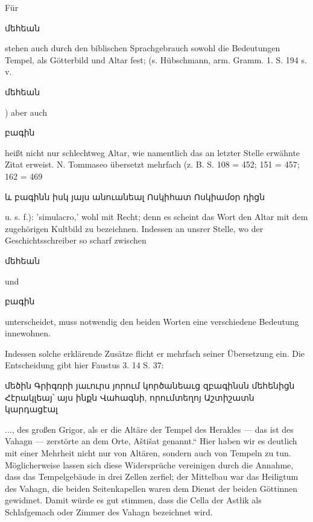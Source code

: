\documentclass{article}
\begin{document}
{\begin{table}[H]
\begin{tabular}{p{45mm}|p{45mm}}
    \end{tabular}
\end{table}\hspace*{5mm}Für \begin{armenian}մեհեան\end{armenian} stehen auch durch den biblischen Sprachgebrauch sowohl die Bedeutungen Tempel, als Götterbild und Altar fest; (s. Hübschmann, arm. Gramm. 1. S. 194 s. v. \begin{armenian}մեհեան\end{armenian}) aber auch \begin{armenian}բագին\end{armenian} heißt nicht nur schlechtweg Altar, wie namentlich das an letzter Stelle erwähnte Zitat erweist. N. Tommaseo übersetzt mehrfach (z. B. S. 108 = 452; 151 = 457; 162 = 469 \begin{armenian}և բագինն իսկ յայս անուանեալ Ոսկիհատ Ոսկիամօր դիցն\end{armenian} u. s. f.): 'simulacro,' wohl mit Recht; denn es scheint das Wort den Altar mit dem zugehörigen Kultbild zu bezeichnen. Indessen an unsrer Stelle, wo der Geschichtsschreiber so scharf zwischen \begin{armenian}մեհեան\end{armenian} und \begin{armenian}բագին\end{armenian} unterscheidet, muss notwendig den beiden Worten eine verschiedene Bedeutung innewohnen.} Indessen solche erklärende Zusätze flicht er mehrfach seiner Übersetzung ein. Die Entscheidung gibt hier Faustus 3. 14 S. 37: \begin{armenian}մեծին Գրիգռրի յաւուրս յորում կործանեաւց զբագինսն մեհենիցն Հէրակլեայ՝ այս ինքն Վահագնի, որումտեղոյ Աշտիշատն կարդացէալ\end{armenian}..., des großen Grigor, als er die Altäre der Tempel des Herakles — das ist des Vahagn — zerstörte an dem Orte, Aštišat genannt.“ Hier haben wir es deutlich mit einer Mehrheit nicht nur von Altären, sondern auch von Tempeln zu tun. Möglicherweise lassen sich diese Widersprüche vereinigen durch die Annahme, dass das Tempelgebäude in drei Zellen zerfiel; der Mittelbau war das Heiligtum des Vahagn, die beiden Seitenkapellen waren dem Dienst der beiden Göttinnen gewidmet. Damit würde es gut stimmen, dass die Cella der Astłik als Schlafgemach oder Zimmer des Vahagn bezeichnet wird.
\end{document}
